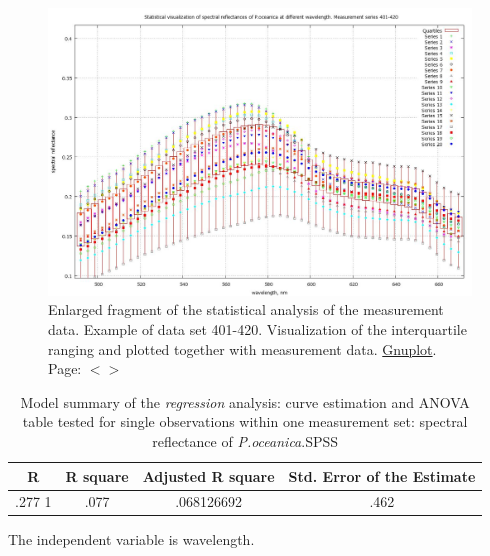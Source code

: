 \documentclass[11pt]{article}
\begin{document}
\begin{appendices}
\begin{figure}[H]
	\begin{center}
		\includegraphics[scale=0.25]{GNU-enlarged-M-401-420.jpg}
		\caption{Enlarged fragment of the statistical analysis of the measurement data. Example of data set 401-420. 
		Visualization of the interquartile ranging and plotted together with measurement data. \href{http://www.gnuplot.info/}{Gnuplot}. Page: $<$\pageref{page-31}$>$}
		\label{fig:A.14}
	\end{center}
\end{figure}

\begin{table}[H]\footnotesize
	\caption{Model summary of the \textit{regression} analysis: curve estimation and ANOVA table tested for single observations within one measurement set: spectral reflectance of \textit{P.oceanica}.\ac{SPSS}}
	\begin{center}
		\begin{tabular}{|c|c|c|c|}
			\hline\hline
			\textbf{R} & \textbf{R square} & \textbf{Adjusted R square} & \textbf{Std. Error of the Estimate} \\ \hline\hline
			.277 1 & .077 & .068126692 & .462 \\ \hline
		\end{tabular}
	\end{center}
	The independent variable is wavelength. 
	\label{tab:5}
\end{table}


\end{appendices}
\end{document}
